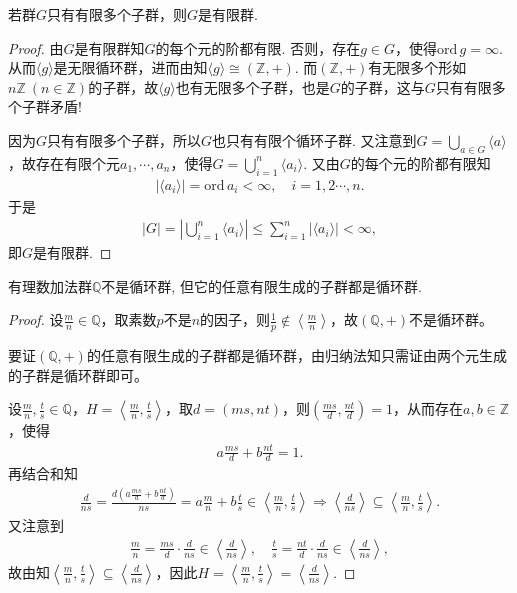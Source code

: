 \documentclass[../../main.tex]{subfiles}%
\begin{document}
\begin{example}
若群$G$只有有限多个子群，则$G$是有限群.
\end{example}
\begin{proof}

由$G$是有限群知$G$的每个元的阶都有限. 否则，存在$g\in G$，使得$\mathrm{ord}\,g=\infty$. 从而$\langle g \rangle$是无限循环群，进而由知$\langle g \rangle \cong (\mathbb{Z},+)$. 而$(\mathbb{Z},+)$有无限多个形如$n\mathbb{Z} \ (n\in\mathbb{Z})$的子群，故$\langle g \rangle$也有无限多个子群，也是$G$的子群，这与$G$只有有限多个子群矛盾!

因为$G$只有有限多个子群，所以$G$也只有有限个循环子群. 又注意到$G=\bigcup\limits_{a\in G}\langle a \rangle$，故存在有限个元$a_1,\cdots,a_n$，使得$G=\bigcup\limits_{i=1}^n\langle a_i \rangle$. 又由$G$的每个元的阶都有限知
\begin{align*}
\left| \langle a_i \rangle \right|=\mathrm{ord}\,a_i<\infty ,\quad i=1,2\cdots ,n.
\end{align*}
于是
\begin{align*}
\left| G \right|=\left| \bigcup\limits_{i=1}^n\langle a_i \rangle \right|\leqslant \sum\limits_{i=1}^n\left| \langle a_i \rangle \right|<\infty ,
\end{align*}
即$G$是有限群.

\end{proof}

\begin{example}
有理数加法群$\mathbb{Q}$不是循环群, 但它的任意有限生成的子群都是循环群.
\end{example}
\begin{proof}

设$\frac{m}{n}\in\mathbb{Q}$，取素数$p$不是$n$的因子，则$\frac{1}{p}\notin\left<\frac{m}{n}\right>$，故$(\mathbb{Q},+)$不是循环群。

要证$(\mathbb{Q},+)$的任意有限生成的子群都是循环群，由归纳法知只需证由两个元生成的子群是循环群即可。

设$\frac{m}{n},\frac{t}{s}\in\mathbb{Q}$，$H=\left<\frac{m}{n},\frac{t}{s}\right>$，取$d=(ms,nt)$，则$\left(\frac{ms}{d},\frac{nt}{d}\right)=1$，从而存在$a,b\in\mathbb{Z}$，使得
\begin{align*}
a\frac{ms}{d}+b\frac{nt}{d}=1.
\end{align*}
再结合和知
\begin{align*}
\frac{d}{ns}=\frac{d\left(a\frac{ms}{d}+b\frac{nt}{d}\right)}{ns}=a\frac{m}{n}+b\frac{t}{s}\in\left<\frac{m}{n},\frac{t}{s}\right>\Longrightarrow\left<\frac{d}{ns}\right>\subseteq\left<\frac{m}{n},\frac{t}{s}\right>.
\end{align*}
又注意到
\begin{align*}
\frac{m}{n}=\frac{ms}{d}\cdot\frac{d}{ns}\in\left<\frac{d}{ns}\right>,\quad\frac{t}{s}=\frac{nt}{d}\cdot\frac{d}{ns}\in\left<\frac{d}{ns}\right>,
\end{align*}
故由知$\left<\frac{m}{n},\frac{t}{s}\right>\subseteq\left<\frac{d}{ns}\right>$，因此$H=\left<\frac{m}{n},\frac{t}{s}\right>=\left<\frac{d}{ns}\right>$.

\end{proof}
\end{document}
